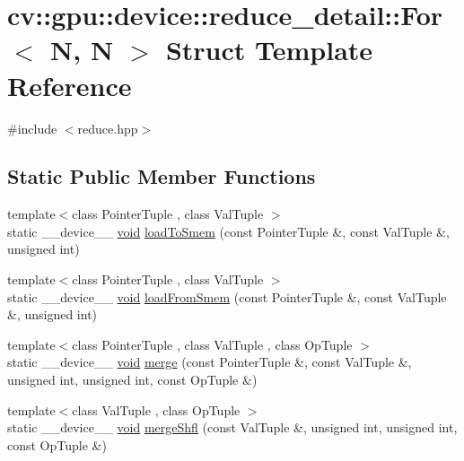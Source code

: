 \hypertarget{structcv_1_1gpu_1_1device_1_1reduce__detail_1_1For_3_01N_00_01N_01_4}{\section{cv\-:\-:gpu\-:\-:device\-:\-:reduce\-\_\-detail\-:\-:For$<$ N, N $>$ Struct Template Reference}
\label{structcv_1_1gpu_1_1device_1_1reduce__detail_1_1For_3_01N_00_01N_01_4}
}


{\ttfamily \#include $<$reduce.\-hpp$>$}

\subsection*{Static Public Member Functions}
\begin{DoxyCompactItemize}
\item 
{\footnotesize template$<$class Pointer\-Tuple , class Val\-Tuple $>$ }\\static \-\_\-\-\_\-device\-\_\-\-\_\- \hyperlink{legacy_8hpp_a8bb47f092d473522721002c86c13b94e}{void} \hyperlink{structcv_1_1gpu_1_1device_1_1reduce__detail_1_1For_3_01N_00_01N_01_4_af26844a54909f74347ee65ee4c482e1b}{load\-To\-Smem} (const Pointer\-Tuple \&, const Val\-Tuple \&, unsigned int)
\item 
{\footnotesize template$<$class Pointer\-Tuple , class Val\-Tuple $>$ }\\static \-\_\-\-\_\-device\-\_\-\-\_\- \hyperlink{legacy_8hpp_a8bb47f092d473522721002c86c13b94e}{void} \hyperlink{structcv_1_1gpu_1_1device_1_1reduce__detail_1_1For_3_01N_00_01N_01_4_ab761a022f5281a6f49b9886d47bb461b}{load\-From\-Smem} (const Pointer\-Tuple \&, const Val\-Tuple \&, unsigned int)
\item 
{\footnotesize template$<$class Pointer\-Tuple , class Val\-Tuple , class Op\-Tuple $>$ }\\static \-\_\-\-\_\-device\-\_\-\-\_\- \hyperlink{legacy_8hpp_a8bb47f092d473522721002c86c13b94e}{void} \hyperlink{structcv_1_1gpu_1_1device_1_1reduce__detail_1_1For_3_01N_00_01N_01_4_a697efa9a43a1a49b1bc74f34e3acfb5c}{merge} (const Pointer\-Tuple \&, const Val\-Tuple \&, unsigned int, unsigned int, const Op\-Tuple \&)
\item 
{\footnotesize template$<$class Val\-Tuple , class Op\-Tuple $>$ }\\static \-\_\-\-\_\-device\-\_\-\-\_\- \hyperlink{legacy_8hpp_a8bb47f092d473522721002c86c13b94e}{void} \hyperlink{structcv_1_1gpu_1_1device_1_1reduce__detail_1_1For_3_01N_00_01N_01_4_a0c2958238c42707afb3a6f6fc134cf0c}{merge\-Shfl} (const Val\-Tuple \&, unsigned int, unsigned int, const Op\-Tuple \&)
\end{DoxyCompactItemize}


